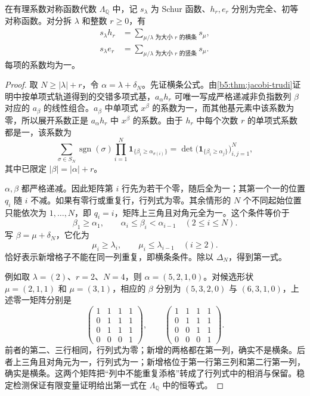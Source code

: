 \begin{theorem}[Pieri 规则]\label{b5:thm:pieri}
	在有理系数对称函数代数 \(\Lambda_{\mathbb Q}\) 中，记 \(s_\lambda\) 为 Schur 函数、\(h_r,e_r\) 分别为完全、初等对称函数。对分拆 \(\lambda\) 和整数 \(r\ge0\)，有
	\begin{align}
		s_\lambda h_r&=\sum_{\mu/\lambda\text{ 为大小 }r\text{ 的横条}}s_\mu,
		\label{b5:eq:pieri-horizontal}\\
		s_\lambda e_r&=\sum_{\mu/\lambda\text{ 为大小 }r\text{ 的竖条}}s_\mu.
		\label{b5:eq:pieri-vertical}
	\end{align}
	每项的系数均为一。
\end{theorem}
\begin{proof}
	取 \(N\ge|\lambda|+r\)，令 \(\alpha=\lambda+\delta_N\)。先证横条公式。由\cref{b5:thm:jacobi-trudi}证明中按单项式轨道得到的交错多项式基，\(a_\alpha h_r\) 可唯一写成严格递减非负指数列 \(\beta\) 对应的 \(a_\beta\) 的线性组合。\(a_\beta\) 中单项式 \(x^\beta\) 的系数为一，而其他基元素中该系数为零，所以展开系数正是 \(a_\alpha h_r\) 中 \(x^\beta\) 的系数。由于 \(h_r\) 中每个次数 \(r\) 的单项式系数都是一，该系数为
	\[
		\sum_{\sigma\in S_N}\operatorname{sgn}(\sigma) \prod_{i=1}^N\mathbf1_{\bigl\{\beta_i\ge\alpha_{\sigma(i)}\bigr\}} =\det\bigl(\mathbf1_{\{\beta_i\ge\alpha_j\}}\bigr)_{i,j=1}^N,
	\]
	其中已限定 \(|\beta|=|\alpha|+r\)。

	\(\alpha,\beta\) 都严格递减。因此矩阵第 \(i\) 行先为若干个零，随后全为一；其第一个一的位置 \(q_i\) 随 \(i\) 不减。如果有零行或重复行，行列式为零。其余情形的 \(N\) 个不同起始位置只能依次为 \(1,\ldots,N\)，即 \(q_i=i\)，矩阵上三角且对角元全为一。这个条件等价于
	\[
		\beta_1\ge\alpha_1,\qquad \alpha_i\le\beta_i<\alpha_{i-1}\quad(2\le i\le N).
	\]
	写 \(\beta=\mu+\delta_N\)，它化为
	\[
		\mu_i\ge\lambda_i,\qquad \mu_i\le\lambda_{i-1}\quad(i\ge2).
	\]
	恰好表示新增格子不能在同一列重复，即横条条件。除以 \(\Delta_N\)，得到第一式。

	例如取 \(\lambda=(2)\)、\(r=2\)、\(N=4\)，则 \(\alpha=(5,2,1,0)\)。对候选形状 \(\mu=(2,1,1)\) 和 \(\mu=(3,1)\)，相应的 \(\beta\) 分别为 \((5,3,2,0)\) 与 \((6,3,1,0)\)，上述零一矩阵分别是
	\[
		\begin{pmatrix}
			1&1&1&1\\0&1&1&1\\0&1&1&1\\0&0&0&1
		\end{pmatrix},\qquad
		\begin{pmatrix}
			1&1&1&1\\0&1&1&1\\0&0&1&1\\0&0&0&1
		\end{pmatrix}.
	\]
	前者的第二、三行相同，行列式为零；新增的两格都在第一列，确实不是横条。后者上三角且对角元为一，行列式为一；新增格位于第一行第三列和第二行第一列，确实是横条。这两个矩阵把“列中不能重复添格”转成了行列式中的相消与保留。稳定检测保证有限变量证明给出第一式在 \(\Lambda_{\mathbb Q}\) 中的恒等式。


\end{proof}
